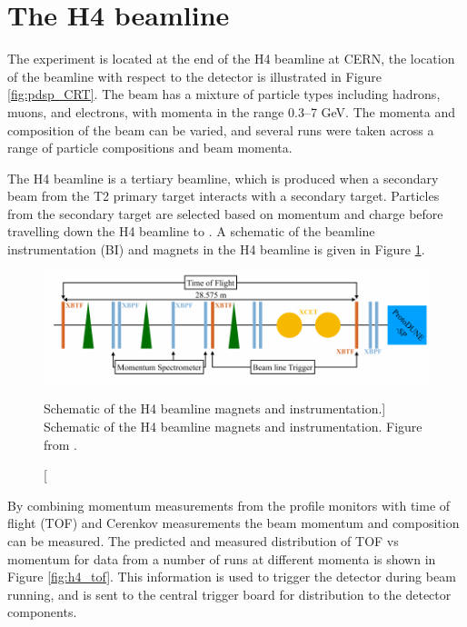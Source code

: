 \section{The H4 beamline} \label{sec:h4}

The \protodune{} experiment is located at the end of the H4 beamline at CERN,
the location of the beamline with respect to the detector is illustrated in
Figure \ref{fig:pdsp_CRT}. The beam has a mixture of particle types including
hadrons, muons, and electrons, with momenta in the range 0.3--7 GeV. The momenta
and composition of the beam can be varied, and several runs were taken across a
range of particle compositions and beam momenta.

The H4 beamline is a tertiary beamline, which is produced when a secondary beam
from the T2 primary target interacts with a secondary target. Particles from the
secondary target are selected based on momentum and charge before travelling down
the H4 beamline to \protodune{}. A schematic of the beamline instrumentation
(BI) and magnets in the H4 beamline is given in Figure \ref{fig:h4_schem}. 

\begin{figure}

	\centering

	\includegraphics[width=\textwidth]{figures/h4_schem.pdf}

	\caption
	[Schematic of the H4 beamline magnets and instrumentation.]
	{Schematic of the H4 beamline magnets and instrumentation. Figure from
	\cite{protoduneperf}.}

	\label{fig:h4_schem}

\end{figure}

By combining momentum measurements from the profile monitors with time of flight
(TOF) and Cerenkov measurements the beam momentum and composition can be 
measured. The predicted and measured distribution of TOF vs momentum for data 
from a number of runs at different momenta is shown in Figure \ref{fig:h4_tof}.
This information is used to trigger the detector during beam running, and is
sent to the central trigger board for distribution to the detector components.

